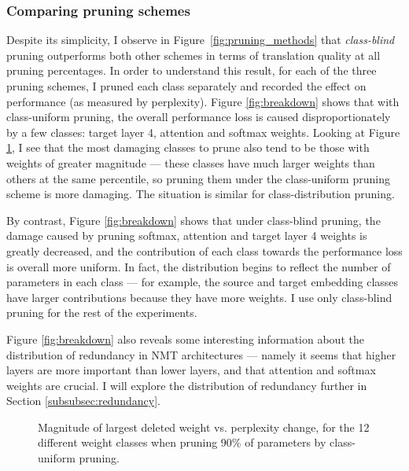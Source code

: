 \subsubsection{Comparing pruning schemes}
\label{subsubsec:exp_schemes}
Despite its simplicity, I observe in Figure~\ref{fig:pruning_methods} that {\it
class-blind} pruning outperforms both other schemes in terms of translation
quality at all pruning percentages.
In order to understand this result, for each of the three pruning schemes, I pruned each class separately and recorded the effect on performance (as measured by perplexity).
Figure \ref{fig:breakdown} shows that with class-uniform pruning, the overall performance loss is caused disproportionately by a few classes: target layer 4, attention and softmax weights. Looking at Figure \ref{fig:scatter}, I see that the most damaging classes to prune also tend to be those with weights of greater magnitude --- these classes have much larger weights than others at the same percentile, so pruning them under the class-uniform pruning scheme is more damaging. The situation is similar for class-distribution pruning.



By contrast, Figure \ref{fig:breakdown} shows that under class-blind pruning, the damage caused by pruning softmax, attention and target layer 4 weights is greatly decreased, and the contribution of each class towards the performance loss is overall more uniform.
In fact, the distribution begins to reflect the number of parameters in each class --- for example, the source and target embedding classes have larger contributions because they have more weights. 
I use only class-blind pruning for the rest of the experiments.

Figure \ref{fig:breakdown} also reveals some interesting information about the
distribution of redundancy in NMT architectures --- namely it seems that higher
layers are more important than lower layers, and that attention and softmax
weights are crucial. I will explore the distribution of redundancy further in
Section \ref{subsubsec:redundancy}.

\begin{figure}
\centering

\caption[Magnitude of largest deleted weight vs. perplexity change]{Magnitude of largest deleted weight vs. perplexity change, for the 12
different weight classes when pruning 90\% of parameters by class-uniform
pruning.}
\label{fig:scatter}
\end{figure}

